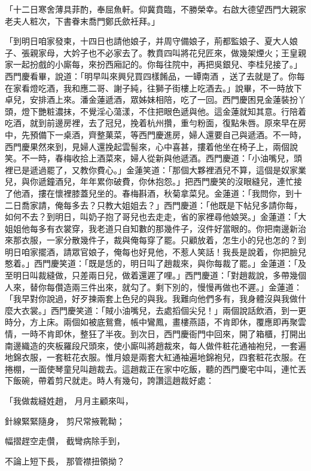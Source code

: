 「十二日寒舍薄具菲酌，奉屈魚軒。仰冀賁臨，不勝榮幸。右啟大德望西門大親家老夫人粧次，下書眷末喬門鄭氏歛衽拜。」

「到明日咱家發柬，十四日也請他娘子，并周守備娘子，荊都監娘子、夏大人娘子、張親家母，大妗子也不必家去了。教賁四叫將花兒匠來，做幾架煙火；王皇親家一起扮戲的小廝每，來扮西廂記的。你每往院中，再把吳銀兒、李桂兒接了。」西門慶看畢，說道：「明早叫來興兒買四樣餚品，一罈南酒 ，送了去就是了。你每在家看燈吃酒，我和應二哥、謝子純，往獅子街樓上吃酒去。」說畢，不一時放下卓兒，安排酒上來。潘金蓮遞酒，眾姊妹相陪，吃了一回。西門慶困見金蓮裝扮丫頭，燈下艷粧濃抹，不覺淫心蕩漾，不住把眼色遞與他。這金蓮就知其意。行陪着吃酒，就到前邊房裡，去了冠兒，挽着杭州攢，重勻粉面，復點朱唇。原來早在房中，先預備下一桌酒，齊整菓菜，等西門慶進房，婦人還要自己與遞酒。不一時，西門慶果然來到，見婦人還挽起雲髻來，心中喜甚，摟着他坐在椅子上，兩個說笑。不一時，春梅收拾上酒菜來，婦人從新與他遞酒。西門慶道：「小油嘴兒，頭裡已是遞過罷了，又教你費心。」金蓮笑道：「那個大夥裡酒兒不算，這個是奴家業兒，與你遞鐘酒兒，年年累你破費，你休抱怨。」把西門慶笑的沒眼縫兒，連忙接了他酒，摟在懷裡膝蓋兒坐的。春梅斟酒，秋菊拿菜兒。金蓮道：「我問你，到十二日喬家請，俺每多去？只教大姐姐去？」西門慶道：「他既是下帖兒多請你每，如何不去？到明日，叫奶子抱了哥兒也去走走，省的家裡尋他娘哭。」金蓮道：「大姐姐他每多有衣裳穿，我老道只自知數的那幾件子，沒件好當眼的。你把南邊新治來那衣服，一家分散幾件子，裁與俺每穿了罷。只顧放着，怎生小的兒也怎的？到明日咱家擺酒，請眾官娘子，俺每也好見他，不惹人笑話！我長是說着，你把臉兒憨着。」西門慶笑道：「既是恁的，明日叫了趙裁來，與你每裁了罷。」金蓮道：「及至明日叫裁縫做，只差兩日兒，做着還遲了哩。」西門慶道：「對趙裁說，多帶幾個人來，替你每儹造兩三件出來，就勾了。剩下別的，慢慢再做也不遲。」金蓮道：「我早對你說過，好歹揀兩套上色兒的與我。我難向他們多有，我身體沒與我做什麼大衣裳。」西門慶笑道：「賊小油嘴兒，去處搯個尖兒！」兩個說話飲酒，到一更時分，方上床。兩個如被底鴛鴦，帳中鸞鳳，畫樓燕語，不肯即休，覆應即再聚雲情，一時不肯即休，整狂了半夜。到次日，西門慶衙門中回來，開了箱櫃，打開出南邊織造的夾板羅段尺頭來，使小廝叫將趙裁來，每人做件粧花通袖袍兒，一套遍地錦衣服，一套粧花衣服。惟月娘是兩套大紅通袖遍地錦袍兒，四套粧花衣服。在捲棚，一面使琴童兒叫趙裁去。這趙裁正在家中吃飯，聽的西門慶宅中叫，連忙丟下飯碗，帶着剪尺就走。時人有幾句，誇讚這趙裁好處：

「我做裁縫姓趙，  月月主顧來叫，

針線緊緊隨身，  剪尺常掖靴靿；

幅摺趕空走儹，  截彎病除手到，

不論上短下長，  那管襟扭領拗？

